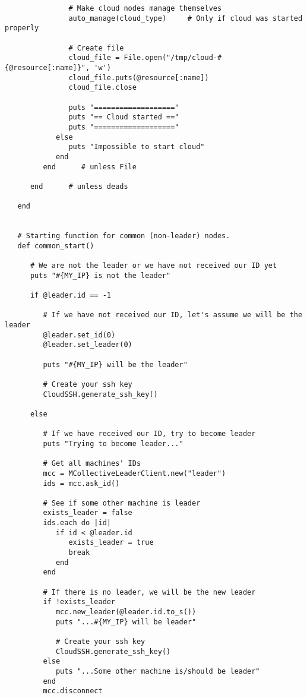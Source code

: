 \begin{lstlisting}
               # Make cloud nodes manage themselves
               auto_manage(cloud_type)     # Only if cloud was started properly
               
               # Create file
               cloud_file = File.open("/tmp/cloud-#{@resource[:name]}", 'w')
               cloud_file.puts(@resource[:name])
               cloud_file.close
               
               puts "==================="
               puts "== Cloud started =="
               puts "==================="
            else
               puts "Impossible to start cloud"
            end
         end      # unless File
         
      end      # unless deads

   end


   # Starting function for common (non-leader) nodes.
   def common_start()

      # We are not the leader or we have not received our ID yet
      puts "#{MY_IP} is not the leader"
            
      if @leader.id == -1
         
         # If we have not received our ID, let's assume we will be the leader
         @leader.set_id(0)
         @leader.set_leader(0)
         
         puts "#{MY_IP} will be the leader"
         
         # Create your ssh key
         CloudSSH.generate_ssh_key()
         
      else
         
         # If we have received our ID, try to become leader
         puts "Trying to become leader..."
         
         # Get all machines' IDs
         mcc = MCollectiveLeaderClient.new("leader")
         ids = mcc.ask_id()
         
         # See if some other machine is leader
         exists_leader = false
         ids.each do |id|
            if id < @leader.id
               exists_leader = true 
               break
            end
         end
         
         # If there is no leader, we will be the new leader
         if !exists_leader
            mcc.new_leader(@leader.id.to_s())
            puts "...#{MY_IP} will be leader"
            
            # Create your ssh key
            CloudSSH.generate_ssh_key()
         else
            puts "...Some other machine is/should be leader"
         end
         mcc.disconnect
         

\end{lstlisting}
